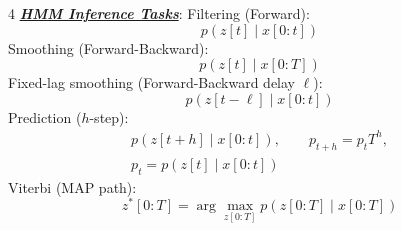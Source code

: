 \documentclass[12pt]{article}
\newcommand{\bulletPoint}[1]{\ul{\textit{\textbf{#1}}}}
\begin{document}
\begin{multicols*}{4}
\bulletPoint{HMM Inference Tasks}:
Filtering (Forward):
\useshortskip \begin{equation*}
    p(z[t]\mid x[0:t])
\end{equation*}
Smoothing (Forward-Backward):
\useshortskip \begin{equation*}
    p(z[t]\mid x[0:T])
\end{equation*}
Fixed-lag smoothing (Forward-Backward delay $\ell$):
\useshortskip \begin{equation*}
    p(z[t-\ell]\mid x[0:t])
\end{equation*}
Prediction ($h$-step):
\useshortskip \begin{equation*}
    \begin{split}
        p(z[t+h]\mid x[0:t]),\qquad
        p_{t+h}=p_tT^h,\\
        p_t=p(z[t]\mid x[0:t])
    \end{split}
\end{equation*}
Viterbi (MAP path):
\useshortskip \begin{equation*}
    z^*[0:T]=\arg\max_{z[0:T]}p(z[0:T]\mid x[0:T])
\end{equation*}







\end{multicols*}
\end{document}
